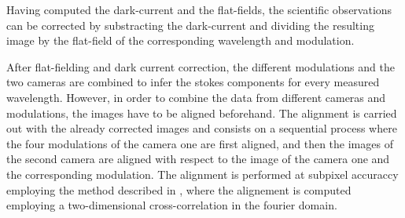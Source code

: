 Having computed the dark-current and the flat-fields, the scientific observations can be corrected by substracting the dark-current and dividing the resulting image by the flat-field of the corresponding wavelength and modulation. 

After flat-fielding and dark current correction, the different modulations and the two cameras are combined to infer the stokes components for every measured wavelength. However, in order to combine the data from different cameras and modulations, the images have to be aligned beforehand. The alignment is carried out with the already corrected images and consists on a sequential process where the four modulations of the camera one are first aligned, and then the images of the second camera are aligned with respect to the image of the camera one and the corresponding modulation. The alignment is performed at subpixel accuraccy employing the method described in \cite{alineamiento}, where the alignement is computed employing a two-dimensional cross-correlation in the fourier domain. 

